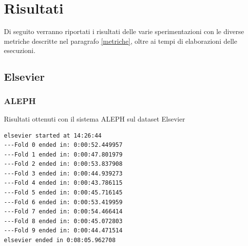 \section{Risultati}
Di seguito verranno riportati i risultati delle varie sperimentazioni con le diverse metriche descritte nel paragrafo \ref{metriche}, oltre ai tempi di elaborazioni delle esecuzioni.
\subsection{Elsevier}
\subsubsection{ALEPH}
\begin{table}[H]
\caption[Risultati ALEPH-Elsevier]{Risultati ottenuti con il sistema ALEPH sul dataset Elsevier}
\label{tab:ris:aleph:elsevier}
\end{table}

\begin{verbatim}
elsevier started at 14:26:44
---Fold 0 ended in: 0:00:52.449957
---Fold 1 ended in: 0:00:47.801979
---Fold 2 ended in: 0:00:53.837908
---Fold 3 ended in: 0:00:44.939273
---Fold 4 ended in: 0:00:43.786115
---Fold 5 ended in: 0:00:45.716145
---Fold 6 ended in: 0:00:53.419959
---Fold 7 ended in: 0:00:54.466414
---Fold 8 ended in: 0:00:45.072803
---Fold 9 ended in: 0:00:44.471514
elsevier ended in 0:08:05.962708
\end{verbatim}

